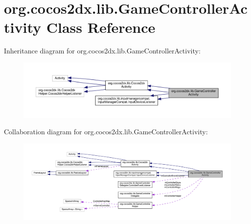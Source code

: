 \hypertarget{classorg_1_1cocos2dx_1_1lib_1_1GameControllerActivity}{}\section{org.\+cocos2dx.\+lib.\+Game\+Controller\+Activity Class Reference}
\label{classorg_1_1cocos2dx_1_1lib_1_1GameControllerActivity}


Inheritance diagram for org.\+cocos2dx.\+lib.\+Game\+Controller\+Activity\+:
\nopagebreak
\begin{figure}[H]
\begin{center}
\leavevmode
\includegraphics[width=350pt]{classorg_1_1cocos2dx_1_1lib_1_1GameControllerActivity__inherit__graph}
\end{center}
\end{figure}


Collaboration diagram for org.\+cocos2dx.\+lib.\+Game\+Controller\+Activity\+:
\nopagebreak
\begin{figure}[H]
\begin{center}
\leavevmode
\includegraphics[width=350pt]{classorg_1_1cocos2dx_1_1lib_1_1GameControllerActivity__coll__graph}
\end{center}
\end{figure}
